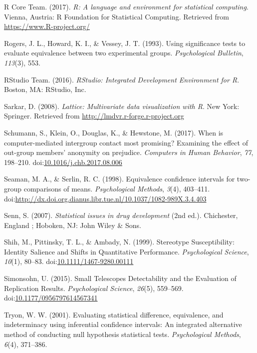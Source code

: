 \documentclass[english,floatsintext,man]{apa6}
\theoremstyle{definition}
\theoremstyle{definition}
\theoremstyle{definition}
\theoremstyle{remark}
\begin{document}
\hypertarget{ref-R-base}{}
R Core Team. (2017). \emph{R: A language and environment for statistical
computing}. Vienna, Austria: R Foundation for Statistical Computing.
Retrieved from \url{https://www.R-project.org/}

\hypertarget{ref-Rogers1993}{}
Rogers, J. L., Howard, K. I., \& Vessey, J. T. (1993). Using
significance tests to evaluate equivalence between two experimental
groups. \emph{Psychological Bulletin}, \emph{113}(3), 553.

\hypertarget{ref-RStudioTeam2016}{}
RStudio Team. (2016). \emph{RStudio: Integrated Development Environment
for R}. Boston, MA: RStudio, Inc.

\hypertarget{ref-R-lattice}{}
Sarkar, D. (2008). \emph{Lattice: Multivariate data visualization with
R}. New York: Springer. Retrieved from
\url{http://lmdvr.r-forge.r-project.org}

\hypertarget{ref-Schumann2017}{}
Schumann, S., Klein, O., Douglas, K., \& Hewstone, M. (2017). When is
computer-mediated intergroup contact most promising? Examining the
effect of out-group members' anonymity on prejudice. \emph{Computers in
Human Behavior}, \emph{77}, 198--210.
doi:\href{https://doi.org/10.1016/j.chb.2017.08.006}{10.1016/j.chb.2017.08.006}

\hypertarget{ref-Seaman1998}{}
Seaman, M. A., \& Serlin, R. C. (1998). Equivalence confidence intervals
for two-group comparisons of means. \emph{Psychological Methods},
\emph{3}(4), 403--411.
doi:\href{https://doi.org/http://dx.doi.org.dianus.libr.tue.nl/10.1037/1082-989X.3.4.403}{http://dx.doi.org.dianus.libr.tue.nl/10.1037/1082-989X.3.4.403}

\hypertarget{ref-Senn2007}{}
Senn, S. (2007). \emph{Statistical issues in drug development} (2nd
ed.). Chichester, England ; Hoboken, NJ: John Wiley \& Sons.

\hypertarget{ref-Shih1999}{}
Shih, M., Pittinsky, T. L., \& Ambady, N. (1999). Stereotype
Susceptibility: Identity Salience and Shifts in Quantitative
Performance. \emph{Psychological Science}, \emph{10}(1), 80--83.
doi:\href{https://doi.org/10.1111/1467-9280.00111}{10.1111/1467-9280.00111}

\hypertarget{ref-Simonsohn2015}{}
Simonsohn, U. (2015). Small Telescopes Detectability and the Evaluation
of Replication Results. \emph{Psychological Science}, \emph{26}(5),
559--569.
doi:\href{https://doi.org/10.1177/0956797614567341}{10.1177/0956797614567341}

\hypertarget{ref-Tryon2001}{}
Tryon, W. W. (2001). Evaluating statistical difference, equivalence, and
indeterminacy using inferential confidence intervals: An integrated
alternative method of conducting null hypothesis statistical tests.
\emph{Psychological Methods}, \emph{6}(4), 371--386.
\end{document}
